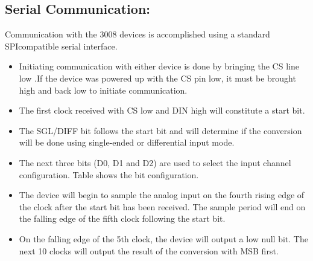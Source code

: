 \documentclass[11pt,a4paper]{article}
\begin{document}
\subsection{Serial Communication:}
Communication with the 3008 devices is accomplished using a standard SPIcompatible serial interface. 
\begin{itemize}
\item Initiating communication with either device is done by bringing the CS line low .If the device was powered up with the CS pin low, it must be brought high and back low to initiate communication. 
\item The first clock received with CS low and DIN high will constitute a start bit. 
\item The SGL/DIFF bit follows the start bit and will determine if the conversion will be done using single-ended or differential input mode. 
\item The next three bits (D0, D1 and D2) are used to select the input channel configuration. Table shows the bit configuration. 
\item The device will begin to sample the analog input on the fourth rising edge of the clock after the start bit has been received. The sample period will end on the falling edge of the fifth clock following the start bit.
\item  On the falling edge of the 5th clock, the device will output a low null bit. The next 10 clocks will output the result of the conversion with MSB first.
\end{itemize}
\end{document}
